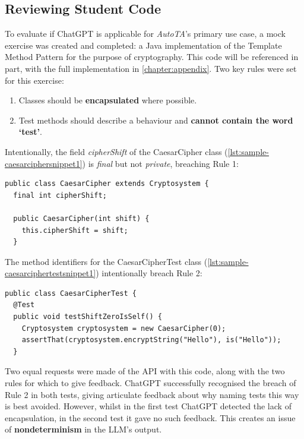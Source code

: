 \subsection{Reviewing Student Code}
\label{subsection: ReviewStudentCode}
To evaluate if ChatGPT is applicable for \emph{AutoTA}'s primary use case, a mock exercise was created and completed: a Java implementation of the Template Method Pattern for the purpose of cryptography. This code will be referenced in part, with the full implementation in \cref{chapter:appendix}. Two key rules were set for this exercise:
\begin{enumerate}
    \item Classes should be \textbf{encapsulated} where possible.
    \item Test methods should describe a behaviour and \textbf{cannot contain the word `test'}.
\end{enumerate}

Intentionally, the field \emph{cipherShift} of the CaesarCipher class (\cref{lst:sample-caesarciphersnippet1}) is \emph{final} but not \emph{private}, breaching Rule 1:

\begin{listing}[H]
\begin{verbatim}
public class CaesarCipher extends Cryptosystem {
  final int cipherShift;

  public CaesarCipher(int shift) {
    this.cipherShift = shift;
  }
\end{verbatim}
\caption{A section of Java code from the CaesarCipher class}
\label{lst:sample-caesarciphersnippet1}
\end{listing}

The method identifiers for the CaesarCipherTest class (\cref{lst:sample-caesarciphertestsnippet1}) intentionally breach Rule 2:

\begin{listing}[H]
\begin{verbatim}
public class CaesarCipherTest {
  @Test
  public void testShiftZeroIsSelf() {
    Cryptosystem cryptosystem = new CaesarCipher(0);
    assertThat(cryptosystem.encryptString("Hello"), is("Hello"));
  }
\end{verbatim}
\caption{A section of Java code from the CaesarCipherTest class}
\label{lst:sample-caesarciphertestsnippet1}
\end{listing}

Two equal requests were made of the API with this code, along with the two rules for which to give feedback. ChatGPT successfully recognised the breach of Rule 2 in both tests, giving articulate feedback about why naming tests this way is best avoided. However, whilst in the first test ChatGPT detected the lack of encapsulation, in the second test it gave no such feedback. This creates an issue of \textbf{nondeterminism} in the LLM's output.

